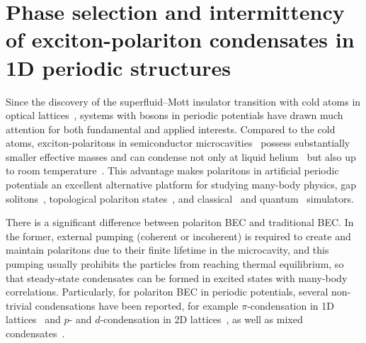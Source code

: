 \section{Phase selection and intermittency of exciton-polariton condensates in 1D periodic structures}\label{Ch3}
Since the discovery of the superfluid--Mott insulator transition with cold atoms in optical lattices~\cite{Jaksch:1998aa,Greiner:2002aa}, systems with bosons in periodic potentials have drawn much attention for both fundamental and applied interests.
Compared to the cold atoms, exciton-polaritons in semiconductor microcavities~\cite{Weisbuch:1992aa,Deng:2002aa,Kavokin:2005kj} possess substantially smaller effective masses and can condense not only at liquid helium~\cite{Kasprzak:2006aa,Balili:2007aa,Lai:2007aa} but also up to room temperature~\cite{Baumberg:2008aa,Lerario:2017aa}.
This advantage makes polaritons in artificial periodic potentials an excellent alternative platform for studying many-body physics, gap solitons~\cite{Tanese:2013aa,Buller:2016aa}, topological polariton states~\cite{Karzig:2015aa,Gulevich:2016aa}, and classical~\cite{Ohadi:2017aa} and quantum~\cite{Liew:2018aa} simulators.

There is a significant difference between polariton BEC and traditional BEC.
In the former, external pumping (coherent or incoherent) is required to create and maintain polaritons due to their finite lifetime in the microcavity, and this pumping usually prohibits the particles from reaching thermal equilibrium, so that steady-state condensates can be formed in excited states with many-body correlations.
Particularly, for polariton BEC in periodic potentials, several non-trivial condensations have been reported, for example $\pi$-condensation in 1D lattices~\cite{Lai:2007aa} and $p$- and $d$-condensation in 2D lattices~\cite{Kim:2011aa}, as well as mixed condensates~\cite{Zhang:2015aa}.

